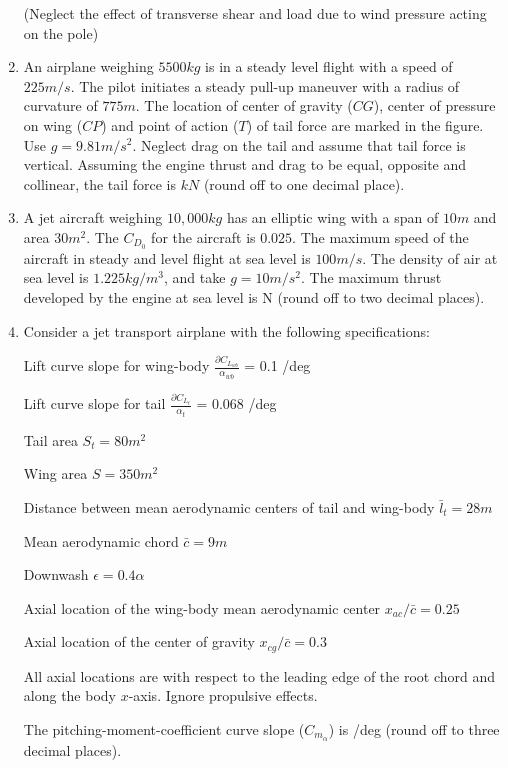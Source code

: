 \documentclass[journal]{IEEEtran}
\begin{document}
\begin{enumerate}
        (Neglect the effect of transverse shear and load due to wind pressure acting on the pole) 
        \begin{figure}[!ht]
            \centering
            
        \end{figure}

    \item An airplane weighing $5500 kg$ is in a steady level flight with a speed of $225 m/s$. The pilot initiates a steady pull-up maneuver with a radius of curvature of $775 m$. The location of center of gravity ($CG$), center of pressure on wing ($CP$) and point of action ($T$) of tail force are marked in the figure. Use $g = 9.81 m/s^2$. Neglect drag on the tail and assume that tail force is vertical. Assuming the engine thrust and drag to be equal, opposite and collinear, the tail force is \underline{\hspace{1cm}} $kN$ (round off to one decimal place).
        \begin{figure}[!ht]
            \centering
            
        \end{figure}

    \item A jet aircraft weighing $10,000 kg$ has an elliptic wing with a span of $10 m$ and area $30 m^2$. The $C_{D_{0}}$ for the aircraft is $0.025$. The maximum speed of the aircraft in steady and level flight at sea level is $100 m/s$. The density of air at sea level is $1.225 kg/m^3$, and take $g = 10 m/s^2$. The maximum thrust developed by the engine at sea level is \underline{\hspace{1cm}} N (round off to two decimal places). 

    \item Consider a jet transport airplane with the following specifications:

        Lift curve slope for wing-body $\frac{\partial C_{L_{wb}}}{\alpha_{wb}}$ = 0.1 /deg

        Lift curve slope for tail $\frac{\partial C_{L_{t}}}{\alpha_{t}}$ = 0.068 /deg

        Tail area $S_{t} = 80 m^2$

        Wing area $S = 350 m^2$

        Distance between mean aerodynamic centers of tail and wing-body $\bar{l}_{t}=28 m$

        Mean aerodynamic chord $\bar{c} = 9m$

        Downwash $\epsilon = 0.4\alpha$

        Axial location of the wing-body mean aerodynamic center $x_{ac}/\bar{c} = 0.25$

        Axial location of the center of gravity $x_{cg}/\bar{c} = 0.3$

        All axial locations are with respect to the leading edge of the root chord and along the body $x$-axis. Ignore propulsive effects.

        The pitching-moment-coefficient curve slope ($C_{m_{\alpha}}$) is \underline{\hspace{1cm}} /deg (round off to three decimal places). 

    \end{enumerate}
\end{document}

